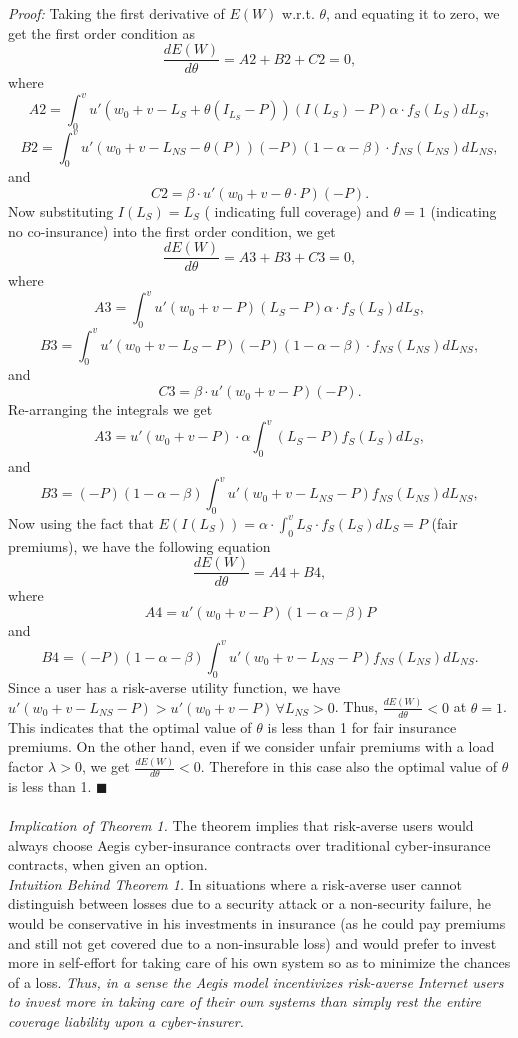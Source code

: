 \documentclass[letterpaper,12pt, onecolumn, nodraft]{IEEEtran}
\begin{document}
\emph{Proof:} Taking the first derivative of $E(W)$ w.r.t. $\theta$, and equating it to zero, we get the first order condition as
\begin{equation}
\frac{dE(W)}{d\theta} = A2 + B2 + C2 = 0,
\end{equation}
where
\[A2 = \int_{0}^{v}u'(w_{0} + v - L_{S} + \theta(I_{L_{S}} - P))(I(L_{S}) - P)\alpha\cdot f_{S}(L_{S})dL_{S},\]
\[B2 = \int_{0}^{v}u'(w_{0} + v - L_{NS} - \theta(P))(-P)(1 - \alpha - \beta)\cdot f_{NS}(L_{NS})dL_{NS},\]
and
\[C2 =  \beta\cdot u'(w_{0} + v - \theta\cdot P)(-P).\]
Now substituting $I(L_{S}) = L_{S}$ ( indicating full coverage) and $\theta = 1$ (indicating no co-insurance) into the first order condition, we get
\begin{equation}
\frac{dE(W)}{d\theta} = A3 + B3 + C3 = 0,
\end{equation}
where
\[A3 = \int_{0}^{v}u'(w_{0} + v - P)(L_{S} - P)\alpha\cdot f_{S}(L_{S})dL_{S},\]
\[B3 = \int_{0}^{v}u'(w_{0} + v - L_{S} - P)(-P)(1 - \alpha - \beta)\cdot f_{NS}(L_{NS})dL_{NS},\]
and
\[C3 =  \beta\cdot u'(w_{0} + v - P)(-P).\]
Re-arranging the integrals we get
\[A3 = u'(w_{0} + v - P)\cdot \alpha\int_{0}^{v}(L_{S} - P) f_{S}(L_{S})dL_{S},\]
and
\[B3 = (-P)(1 - \alpha - \beta)\int_{0}^{v}u'(w_{0} + v - L_{NS} - P) f_{NS}(L_{NS})dL_{NS},\]
Now using the fact that $E(I(L_{S})) = \alpha\cdot\int_{0}^{v}L_{S}\cdot f_{S}(L_{S})dL_{S} = P$ (fair premiums), we have the following equation
\begin{equation}
\frac{dE(W)}{d\theta} = A4 + B4,
\end{equation}
where
\[A4 = u'(w_{0} + v - P)(1 - \alpha - \beta)P\]
and
\[B4 = (-P)(1 - \alpha - \beta)\int_{0}^{v}u'(w_{0} + v - L_{NS} - P) f_{NS}(L_{NS})dL_{NS}.\]
Since a user has a risk-averse utility function, we have $u'(w_{0} + v - L_{NS} - P) > u'(w_{0} + v - P)\, \forall L_{NS} > 0$. Thus, $\frac{dE(W)}{d\theta} < 0$ at $\theta = 1$. This indicates that the optimal value of $\theta$ is less than 1 for fair insurance premiums. On the other hand, even if we consider unfair premiums with a load factor $\lambda > 0$, we get $\frac{dE(W)}{d\theta} < 0$. Therefore in this case also the optimal value of $\theta$ is less than 1.  $\blacksquare$\\ \\
\emph{Implication of Theorem 1.} The theorem implies that risk-averse users would always choose Aegis cyber-insurance contracts over traditional cyber-insurance contracts, when given an option. \\
\emph{Intuition Behind Theorem 1.} In situations where a risk-averse user cannot distinguish between losses due to a security attack or a non-security failure, he would be conservative in his investments in insurance (as he could pay premiums and still not get covered due to a non-insurable loss) and would prefer to invest more in self-effort for taking care of his own system so as to minimize the chances of a loss. \emph{Thus, in a sense the Aegis model incentivizes risk-averse Internet users to invest more in taking care of their own systems than simply rest the entire coverage liability upon a cyber-insurer.}   \\
\end{document}

